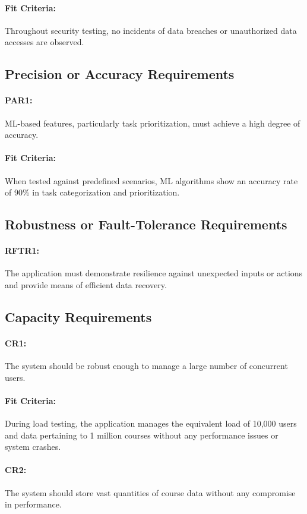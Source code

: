 \documentclass[12pt]{article}
\begin{document}
\paragraph{Fit Criteria:} Throughout security testing, no incidents of data breaches or unauthorized data accesses are observed.

\subsection{Precision or Accuracy Requirements}
\paragraph{PAR1:} ML-based features, particularly task prioritization, must achieve a high degree of accuracy.
\paragraph{Fit Criteria:} When tested against predefined scenarios, ML algorithms show an accuracy rate of 90\% in task categorization and prioritization.

\subsection{Robustness or Fault-Tolerance Requirements}
\paragraph{RFTR1:} The application must demonstrate resilience against unexpected inputs or actions and provide means of efficient data recovery.


\subsection{Capacity Requirements}
\paragraph{CR1:} The system should be robust enough to manage a large number of concurrent users.
\paragraph{Fit Criteria:} During load testing, the application manages the equivalent load of 10,000 users and data pertaining to 1 million courses without any performance issues or system crashes.
\paragraph{CR2:}The system should store vast quantities of course data without any compromise in performance.
\end{document}
